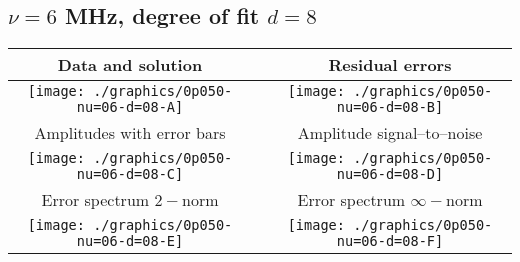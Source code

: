 

% 

\clearpage{}
\break{}

\subsection{$\nu = 6$ MHz, degree of fit $d = 8$}

\begin{table}[h]
    \begin{center}
        \begin{tabular}{ccc}
            Data and solution & \quad & Residual errors \\\hline
            \texttt{[image: ./graphics/0p050-nu=06-d=08-A]} &&
            \texttt{[image: ./graphics/0p050-nu=06-d=08-B]} \\[15pt]
            Amplitudes with error bars && Amplitude signal--to--noise \\\hline
            \texttt{[image: ./graphics/0p050-nu=06-d=08-C]} &&
            \texttt{[image: ./graphics/0p050-nu=06-d=08-D]} \\[15pt]
            Error spectrum $2-$norm && Error spectrum $\infty-$norm \\\hline
            \texttt{[image: ./graphics/0p050-nu=06-d=08-E]} &&
            \texttt{[image: ./graphics/0p050-nu=06-d=08-F]} \\[15pt]
        \end{tabular}
    \end{center}
\label{fig:elev=50, nu=6}
\end{table}



\endinput
